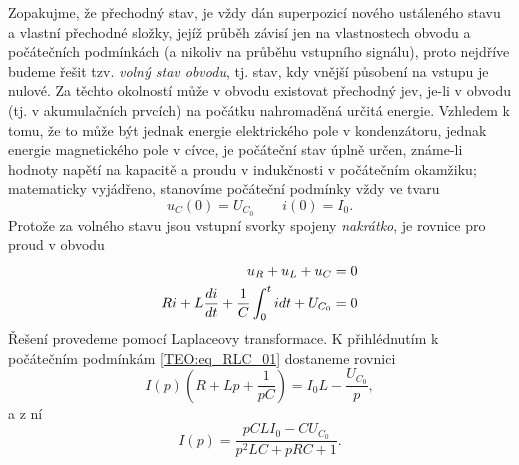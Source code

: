 
    Zopakujme, že přechodný stav, je vždy dán superpozicí nového ustáleného stavu a vlastní
    přechodné složky, jejíž průběh závisí jen na vlastnostech obvodu a počátečních podmínkách (a
    nikoliv na průběhu vstupního signálu), proto nejdříve budeme řešit tzv. \emph{volný stav
    obvodu}, tj. stav, kdy vnější působení na vstupu je nulové. Za těchto okolností může v obvodu
    existovat přechodný jev, je-li v obvodu (tj. v akumulačních prvcích) na počátku nahromaděná
    určitá energie. Vzhledem k tomu, že to může být jednak energie elektrického pole v kondenzátoru,
    jednak energie magnetického pole v cívce, je počáteční stav úplně určen, známe-li hodnoty napětí
    na kapacitě a proudu v indukčnosti v počátečním okamžiku; matematicky vyjádřeno, stanovíme
    počáteční podmínky vždy ve tvaru
    \begin{equation}\label{TEO:eq_RLC_00}
      u_C(0) = U_{C_0} \qquad i(0) = I_0.
    \end{equation}    
    Protože za volného stavu jsou vstupní svorky spojeny \emph{nakrátko}, je rovnice pro proud v
    obvodu
    \begin{align}\label{TEO:eq_RLC_01}
       u_R + u_L + u_C                                    &= 0 \\
       Ri + L\dfrac{d i}{d t} +\frac{1}{C}\int_0^tidt + U_{C_0} &= 0
    \end{align}     
    Řešení provedeme pomocí Laplaceovy transformace. K přihlédnutím  k počátečním podmínkám
    \ref{TEO:eq_RLC_01} dostaneme rovnici
    \begin{equation}\label{TEO:eq_RLC_02}
      I(p)(R + Lp + \frac{1}{pC}) = I_0L - \frac{U_{C_0}}{p},
    \end{equation}     
    a z ní 
    \begin{equation}\label{TEO:eq_RLC_03}
      I(p) = \frac{pCLI_0 - CU_{C_0}}{p^2LC + pRC + 1}.
    \end{equation}

